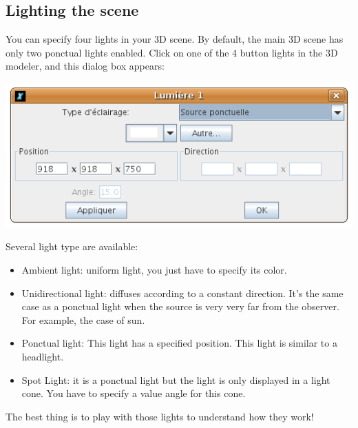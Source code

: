 \subsection{Lighting the scene}
You can specify four lights in your 3D scene. By default, the main 3D scene has only two ponctual lights enabled. Click on one of the 4 button lights in the 3D modeler, and this dialog box appears:
\begin{center}
 \includegraphics*[scale=0.6]{pics/CaptureLight.png}
\end{center}
Several light type are available:
\begin{itemize}
\item Ambient light: uniform light, you just have to specify its color.
\item Unidirectional light: diffuses according to a constant direction. It's the same case as a ponctual light when the source is very very far from the observer. For example, the case of sun.
\item Ponctual light: This light has a specified position. This light is similar to a headlight.
\item Spot Light: it is a ponctual light but the light is only displayed in a light cone. You have to specify a value angle for this cone.
\end{itemize}
The best thing is to play with those lights to understand how they work!
